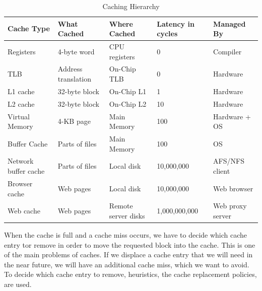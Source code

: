 \documentclass[
	12pt,
	a4paper,
	abstract,
	bibliography=totoc,
	chapterprefix,
	headings=openright,
	numbers=endperiod,
	parskip=half,
	twoside,
]{scrreprt}
\begin{document}
\begin{table}[ht]
	\centering
	\begin{tabular}{|p{3cm}|p{3cm}|p{3cm}|p{2cm}|p{3cm}|}
		\hline
		\textbf{Cache Type} & \textbf{What Cached} & \textbf{Where Cached} & \textbf{Latency in cycles} & \textbf{Managed By}\\
		\hline
		Registers & 4-byte word & CPU registers & 0 & Compiler \\
		\hline
		TLB & Address translation & On-Chip TLB & 0 & Hardware \\
		\hline
		L1 cache & 32-byte block & On-Chip L1 & 1 & Hardware \\
		\hline
		L2 cache & 32-byte block & On-Chip L2 & 10 & Hardware \\
		\hline
		Virtual Memory & 4-KB page & Main Memory & 100 & Hardware + OS \\
		\hline
		Buffer Cache & Parts of files & Main Memory & 100 & OS \\
		\hline
		Network buffer cache & Parts of files & Local disk & 10,000,000 & AFS/NFS client \\
		\hline
		Browser cache & Web pages & Local disk & 10,000,000 & Web browser \\
		\hline
		Web cache & Web pages & Remote server disks & 1,000,000,000 & Web proxy server \\
		\hline
	\end{tabular}
	\caption{Caching Hierarchy \cite{7569243}}
	\label{tab:caching hierarchy}
\end{table}


When the cache is full and a cache miss occurs, we have to decide which cache entry tor remove in order to move the requested block into the cache.
This is one of the main problems of caches. If we displace a cache entry that we will need in the near future, we will have an additional cache miss, which we want to avoid.
To decide which cache entry to remove, heuristics, the cache replacement policies, are used.
\end{document}
